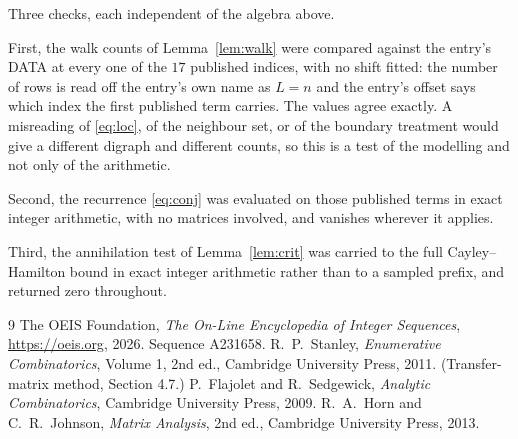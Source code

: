 \documentclass[11pt,a4paper]{article}
\theoremstyle{plain}
\theoremstyle{definition}
\begin{document}
Three checks, each independent of the algebra above.

First, the walk counts of Lemma~\ref{lem:walk} were compared against the entry's DATA at
every one of the $17$ published indices, with no shift fitted: the number of rows is
read off the entry's own name as $L=n$ and the entry's offset says which index the first
published term carries. The values agree exactly. A misreading of \eqref{eq:loc}, of the
neighbour set, or of the boundary treatment would give a different digraph and different
counts, so this is a test of the modelling and not only of the arithmetic.

Second, the recurrence \eqref{eq:conj} was evaluated on those published terms in exact
integer arithmetic, with no matrices involved, and vanishes wherever it applies.

Third, the annihilation test of Lemma~\ref{lem:crit} was carried to the full
Cayley--Hamilton bound in exact integer arithmetic rather than to a sampled prefix, and
returned zero throughout.

\begin{thebibliography}{9}
 The OEIS Foundation, \emph{The On-Line Encyclopedia of Integer
Sequences}, \url{https://oeis.org}, 2026. Sequence A231658.
 R.~P.~Stanley, \emph{Enumerative Combinatorics}, Volume 1, 2nd ed.,
Cambridge University Press, 2011. (Transfer-matrix method, Section 4.7.)
 P.~Flajolet and R.~Sedgewick, \emph{Analytic Combinatorics}, Cambridge
University Press, 2009.
 R.~A.~Horn and C.~R.~Johnson, \emph{Matrix Analysis}, 2nd ed., Cambridge
University Press, 2013.
\end{thebibliography}
\end{document}
